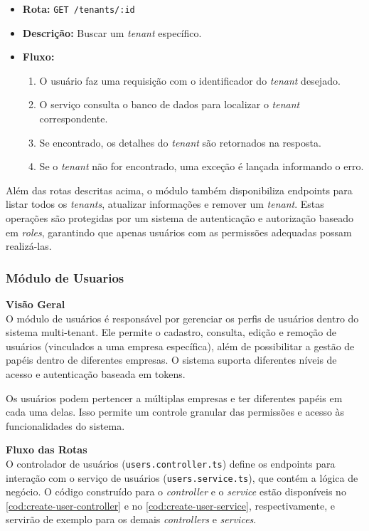 \begin{itemize}
	\item \textbf{Rota:} \texttt{GET /tenants/:id}
	\item \textbf{Descrição:} Buscar um \textit{tenant} específico.
	\item \textbf{Fluxo:}
	\begin{enumerate}
    \item O usuário faz uma requisição com o identificador do \textit{tenant} desejado.
    \item O serviço consulta o banco de dados para localizar o \textit{tenant} correspondente.
    \item Se encontrado, os detalhes do \textit{tenant} são retornados na resposta.
    \item Se o \textit{tenant} não for encontrado, uma exceção é lançada informando o erro.
	\end{enumerate}
\end{itemize}


Além das rotas descritas acima, o módulo também disponibiliza endpoints para listar todos os \textit{tenants}, atualizar informações e remover um \textit{tenant}. Estas operações são protegidas por um sistema de autenticação e autorização baseado em \textit{roles}, garantindo que apenas usuários com as permissões adequadas possam realizá-las.

\subsubsection{Módulo de Usuarios}\label{subsubsec:modulo_usuarios}

\textbf{Visão Geral}\\
O módulo de usuários é responsável por gerenciar os perfis de usuários dentro do sistema multi-tenant. Ele permite o cadastro, consulta, edição e remoção de usuários (vinculados a uma empresa específica), além de possibilitar a gestão de papéis dentro de diferentes empresas. O sistema suporta diferentes níveis de acesso e autenticação baseada em tokens.

Os usuários podem pertencer a múltiplas empresas e ter diferentes papéis em cada uma delas. Isso permite um controle granular das permissões e acesso às funcionalidades do sistema.

\textbf{Fluxo das Rotas}\\
O controlador de usuários (\texttt{users.controller.ts}) define os endpoints para interação com o serviço de usuários (\texttt{users.service.ts}), que contém a lógica de negócio. O código construído para o \textit{controller} e  o \textit{service} estão disponíveis no \autoref{cod:create-user-controller} e  no \autoref{cod:create-user-service}, respectivamente, e servirão de exemplo para os demais \textit{controllers} e \textit{services}.

